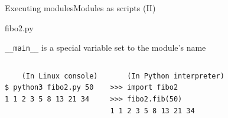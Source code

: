 \documentclass[10pt,compress]{beamer} %
\begin{document}
\begin{frame}{Executing modules}{Modules as scripts (II)}

    \small
	\vspace{-0.3cm}
	\begin{exampleblock}{fibo2.py}
	\vspace{-0.2cm}
	
	\vspace{-0.2cm}
	\end{exampleblock}

    \medskip
    \normalsize{\texttt{\_\_main\_\_} is a special variable set to the module's name}\\
    \medskip

	\vspace{-0.5cm}
	\begin{columns}
	\begin{exampleblock}{}
	\vspace{-0.2cm}
	\begin{verbatim}
    (In Linux console)
$ python3 fibo2.py 50
1 1 2 3 5 8 13 21 34
\end{verbatim}
	\vspace{-0.2cm}
	\end{exampleblock}

	\begin{exampleblock}{}
	\vspace{-0.2cm}
	\begin{verbatim}
    (In Python interpreter)
>>> import fibo2
>>> fibo2.fib(50)
1 1 2 3 5 8 13 21 34
\end{verbatim}
	\vspace{-0.2cm}
	\end{exampleblock}

    \end{columns}
\end{frame}
\end{document}
